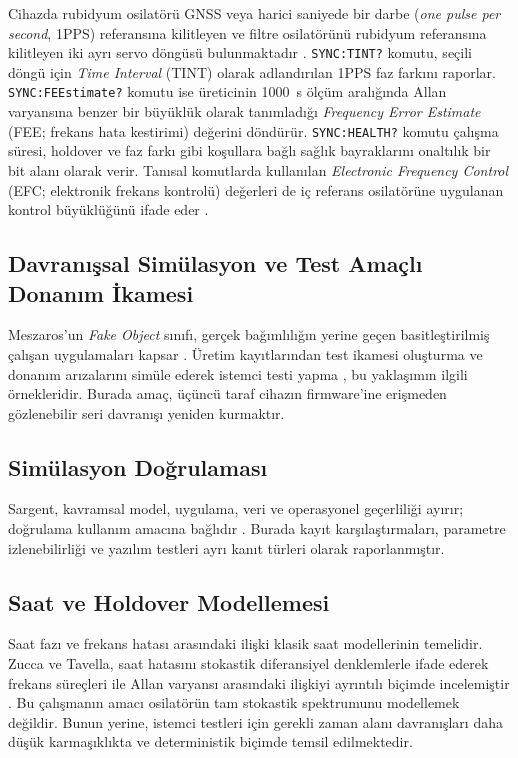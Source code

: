 \documentclass[9pt,twocolumn,a4paper]{extarticle}
\begin{document}
Cihazda rubidyum osilatörü GNSS veya harici saniyede bir darbe (\emph{one pulse per second}, 1PPS) referansına kilitleyen ve filtre osilatörünü rubidyum referansına kilitleyen iki ayrı servo döngüsü bulunmaktadır \cite{jlt2015}. \texttt{SYNC:TINT?} komutu, seçili döngü için \emph{Time Interval} (TINT) olarak adlandırılan 1PPS faz farkını raporlar. \texttt{SYNC:FEEstimate?} komutu ise üreticinin 1000~s ölçüm aralığında Allan varyansına benzer bir büyüklük olarak tanımladığı \emph{Frequency Error Estimate} (FEE; frekans hata kestirimi) değerini döndürür. \texttt{SYNC:HEALTH?} komutu çalışma süresi, holdover ve faz farkı gibi koşullara bağlı sağlık bayraklarını onaltılık bir bit alanı olarak verir. Tanısal komutlarda kullanılan \emph{Electronic Frequency Control} (EFC; elektronik frekans kontrolü) değerleri de iç referans osilatörüne uygulanan kontrol büyüklüğünü ifade eder \cite{jlt2015}.

\subsection{Davranışsal Simülasyon ve Test Amaçlı Donanım İkamesi}
Meszaros'un \emph{Fake Object} sınıfı, gerçek bağımlılığın yerine geçen basitleştirilmiş çalışan uygulamaları kapsar \cite{meszaros2007}. Üretim kayıtlarından test ikamesi oluşturma \cite{tiwari2024} ve donanım arızalarını simüle ederek istemci testi yapma \cite{morita2017}, bu yaklaşımın ilgili örnekleridir. Burada amaç, üçüncü taraf cihazın firmware'ine erişmeden gözlenebilir seri davranışı yeniden kurmaktır.

\subsection{Simülasyon Doğrulaması}
Sargent, kavramsal model, uygulama, veri ve operasyonel geçerliliği ayırır; doğrulama kullanım amacına bağlıdır \cite{sargent2013}. Burada kayıt karşılaştırmaları, parametre izlenebilirliği ve yazılım testleri ayrı kanıt türleri olarak raporlanmıştır.

\subsection{Saat ve Holdover Modellemesi}
Saat fazı ve frekans hatası arasındaki ilişki klasik saat modellerinin temelidir. Zucca ve Tavella, saat hatasını stokastik diferansiyel denklemlerle ifade ederek frekans süreçleri ile Allan varyansı arasındaki ilişkiyi ayrıntılı biçimde incelemiştir \cite{zucca2005}. Bu çalışmanın amacı osilatörün tam stokastik spektrumunu modellemek değildir. Bunun yerine, istemci testleri için gerekli zaman alanı davranışları daha düşük karmaşıklıkta ve deterministik biçimde temsil edilmektedir.
\end{document}
